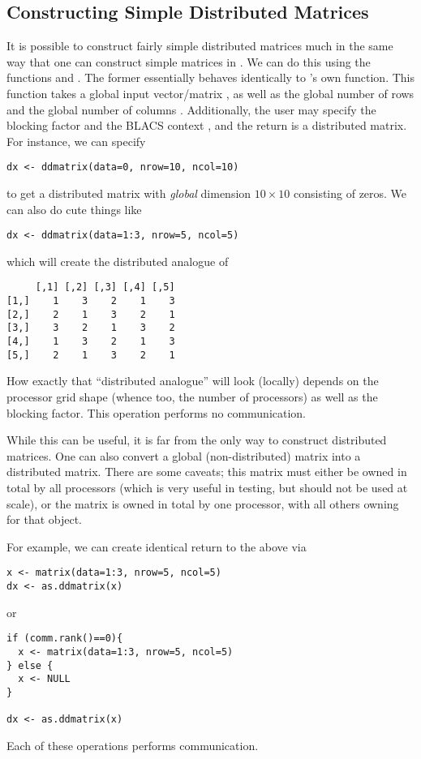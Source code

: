 \subsection{Constructing Simple Distributed Matrices}

It is possible to construct fairly simple distributed matrices much in the same way that one can construct simple matrices in .  We can do this using the functions  and .  The former essentially behaves identically to 's own  function.  This function takes a global input vector/matrix , as well as the global number of rows  and the global number of columns .  Additionally, the user may specify the blocking factor  and the BLACS context , and the return is a distributed matrix.  For instance, we can specify
\begin{lstlisting}[language=rr,title=ddmatrix()]
dx <- ddmatrix(data=0, nrow=10, ncol=10)
\end{lstlisting}
to get a distributed matrix with \emph{global} dimension $10\times 10$ consisting of zeros.  We can also do cute things like
\begin{lstlisting}[language=rr,title=ddmatrix()]
dx <- ddmatrix(data=1:3, nrow=5, ncol=5)
\end{lstlisting}
which will create the distributed analogue of
\begin{verbatim}
     [,1] [,2] [,3] [,4] [,5]
[1,]    1    3    2    1    3
[2,]    2    1    3    2    1
[3,]    3    2    1    3    2
[4,]    1    3    2    1    3
[5,]    2    1    3    2    1
\end{verbatim}
How exactly that ``distributed analogue'' will look (locally) depends on the processor grid shape (whence too, the number of processors) as well as the blocking factor.  This operation performs no communication.

While this can be useful, it is far from the only way to construct distributed matrices.  One can also convert a global (non-distributed) matrix into a distributed matrix.  There are some caveats; this matrix must either be owned in total by all processors (which is very useful in testing, but should not be used at scale), or the matrix is owned in total by one processor, with all others owning  for that object.  

For example, we can create identical return to the above via
\begin{lstlisting}[language=rr,title=as.ddmatrix()]
x <- matrix(data=1:3, nrow=5, ncol=5)
dx <- as.ddmatrix(x)
\end{lstlisting}
or
\begin{lstlisting}[language=rr,title=as.ddmatrix()]
if (comm.rank()==0){
  x <- matrix(data=1:3, nrow=5, ncol=5)
} else {
  x <- NULL
}

dx <- as.ddmatrix(x)
\end{lstlisting}
Each of these operations performs communication.

